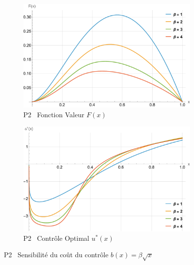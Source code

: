 \FloatBarrier\begin{figure}[htb]
    \centering
    \begin{subfigure}{0.45\linewidth}
        \includegraphics[width=\linewidth]{img/validation/P2/p2_B_value.pdf}
        \caption{P2 \textemdash~Fonction Valeur $F(x)$}\label{fig:BetaValueVisualisation2}
    \end{subfigure}
    \hfill
    \begin{subfigure}{0.45\linewidth}
        \includegraphics[width=\linewidth]{img/validation/P2/p2_B_control.pdf}
        \caption{P2 \textemdash~Contrôle Optimal $u^*(x)$}\label{fig:BetaControlVisualisation2}
    \end{subfigure}
    \caption{P2 \textemdash~Sensibilité du coût du contrôle $b(x)=\beta \sqrt{x}$}\label{fig:BetaValueControlComparison1}
\end{figure}
